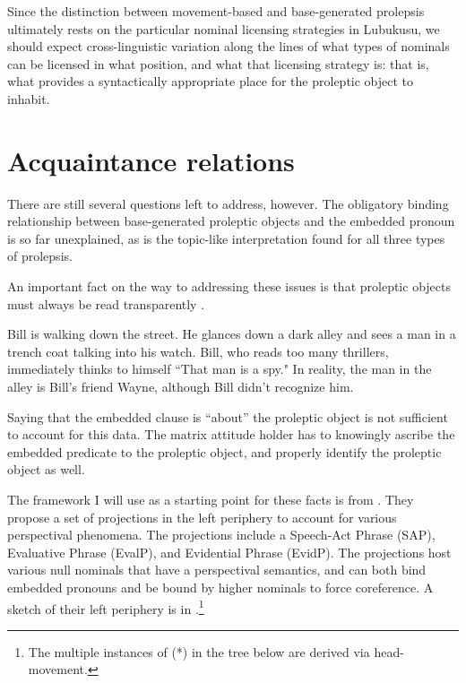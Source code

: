 \documentclass[output=paper,colorlinks,citecolor=brown]{langscibook}
\begin{document}
Since the distinction between movement-based and base-generated prolepsis ultimately rests on the particular nominal licensing strategies in Lubukusu, we should expect cross-linguistic variation along the lines of what types of nominals can be licensed in what position, and what that licensing strategy is: that is, what provides a syntactically appropriate place for the proleptic object to inhabit.

\section{Acquaintance relations}\label{sec:newkirk:4}

There are still several questions left to address, however. The obligatory binding relationship between base-generated proleptic objects and the embedded pronoun is so far unexplained, as is the topic-like interpretation found for all three types of prolepsis.

An important fact on the way to addressing these issues is that proleptic objects must always be read transparently \citep{Salzmann2006,Salzmann2017Chapter}.

\ea%
    \label{ex:newkirk:37} \begin{context}
    Bill is walking down the street. He glances down a dark alley and sees a man in a trench coat talking into his watch. Bill, who reads too many thrillers, immediately thinks to himself ``That man is a spy." In reality, the man in the alley is Bill's friend Wayne, although Bill didn't recognize him.
    \end{context}
	\z
\z

Saying that the embedded clause is ``about'' the proleptic object is not sufficient to account for this data. The matrix attitude holder has to \alert{knowingly ascribe} the embedded predicate to the proleptic object, and properly identify the proleptic object as well.

The framework I will use as a starting point for these facts is from \citet{SpeasTenny2003}. They propose a set of projections in the left periphery to account for various perspectival phenomena. The projections include a Speech-Act Phrase (SAP), Evaluative Phrase (EvalP), and Evidential Phrase (EvidP). The projections host various null nominals that have a perspectival semantics, and can both bind embedded pronouns and be bound by higher nominals to force coreference. A sketch of their left periphery is in .\footnote{The multiple instances of (\**) in the tree below are derived via head-movement.}
\end{document}
